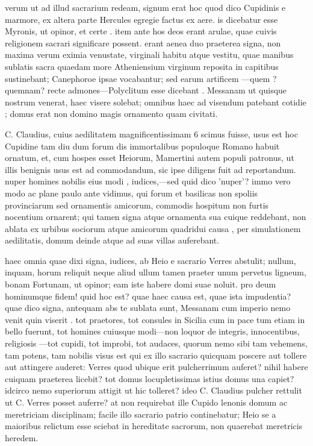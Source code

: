  verum ut ad illud sacrarium redeam, signum erat hoc quod dico Cupidinis e marmore, ex altera parte Hercules egregie factus ex aere. is dicebatur esse Myronis, ut opinor, et certe . item ante hos deos erant arulae, quae cuivis religionem sacrari significare possent. erant aenea duo praeterea signa, non maxima verum eximia venustate, virginali habitu atque vestitu, quae manibus sublatis sacra quaedam more Atheniensium virginum reposita in capitibus sustinebant; Canephoroe ipsae vocabantur; sed earum artificem —quem ? quemnam? recte admones—Polyclitum esse dicebant . Messanam ut quisque nostrum venerat, haec visere solebat; omnibus haec ad visendum patebant cotidie ; domus erat non domino magis ornamento quam civitati.

 C. Claudius, cuius aedilitatem magnificentissimam 6 scimus fuisse, usus est hoc Cupidine tam diu dum forum dis immortalibus populoque Romano habuit ornatum, et, cum hospes esset Heiorum, Mamertini autem populi patronus, ut illis benignis usus est ad commodandum, sic ipse diligens fuit ad reportandum. nuper homines nobilis eius modi , iudices,—sed quid dico 'nuper'? immo vero modo ac plane paulo ante vidimus, qui forum et basilicas non spoliis provinciarum sed ornamentis amicorum, commodis hospitum non furtis nocentium ornarent; qui tamen signa atque ornamenta sua cuique reddebant, non ablata ex urbibus sociorum atque amicorum quadridui causa , per simulationem aedilitatis, domum deinde atque ad suas villas auferebant.

 haec omnia quae dixi signa, iudices, ab Heio e sacrario Verres abstulit; nullum, inquam, horum reliquit neque aliud ullum tamen praeter unum pervetus ligneum, bonam Fortunam, ut opinor; eam iste habere domi suae noluit. pro deum hominumque fidem! quid hoc est? quae haec causa est, quae ista impudentia? quae dico signa, antequam abs te sublata sunt, Messanam cum imperio nemo venit quin viserit . tot praetores, tot consules in Sicilia cum in pace tum etiam in bello fuerunt, tot homines cuiusque modi—non loquor de integris, innocentibus, religiosis —tot cupidi, tot improbi, tot audaces, quorum nemo sibi tam vehemens, tam potens, tam nobilis visus est qui ex illo sacrario quicquam poscere aut tollere aut attingere auderet: Verres quod ubique erit pulcherrimum auferet? nihil habere cuiquam praeterea licebit? tot domus locupletissimas istius domus una capiet? idcirco nemo superiorum attigit ut hic tolleret? ideo C. Claudius pulcher rettulit ut C. Verres posset auferre? at non requirebat ille Cupido lenonis domum ac meretriciam disciplinam; facile illo sacrario patrio continebatur; Heio se a maioribus relictum esse sciebat in hereditate sacrorum, non quaerebat meretricis heredem.

